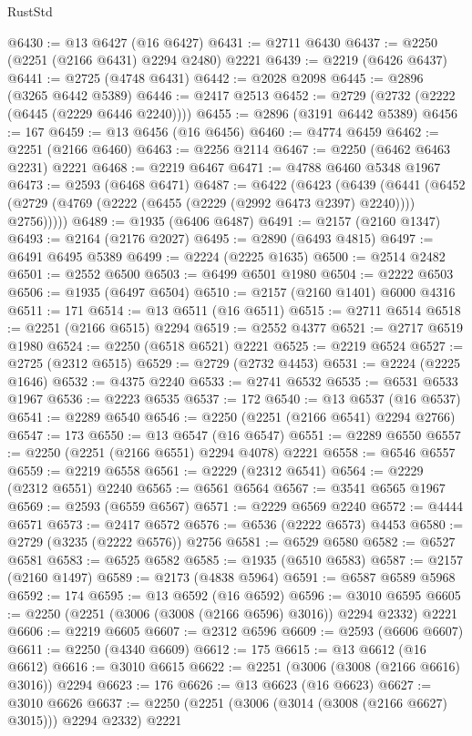 \begin{lexlean}{RustStd}
\begin{coremodule}
{\begin{coremodule}
{{{{{{{{{{{{{{{{{{{{{{{{{{{{{{{{{{{{{{{{{{{{{{{{{{{{{@6430 := @13 @6427 (@16 @6427)
@6431 := @2711 @6430
@6437 := @2250 (@2251 (@2166 @6431) @2294 @2480) @2221
@6439 := @2219 (@6426 @6437)
@6441 := @2725 (@4748 @6431)
@6442 := @2028 @2098
@6445 := @2896 (@3265 @6442 @5389)
@6446 := @2417 @2513
@6452 := @2729 (@2732 (@2222 (@6445 (@2229 @6446 @2240))))
@6455 := @2896 (@3191 @6442 @5389)
@6456 := 167
@6459 := @13 @6456 (@16 @6456)
@6460 := @4774 @6459
@6462 := @2251 (@2166 @6460)
@6463 := @2256 @2114
@6467 := @2250 (@6462 @6463 @2231) @2221
@6468 := @2219 @6467
@6471 := @4788 @6460 @5348 @1967
@6473 := @2593 (@6468 @6471)
@6487 := @6422
    (@6423
      (@6439
        (@6441 (@6452 (@2729 (@4769 (@2222 (@6455 (@2229 (@2992 @6473 @2397) @2240)))) @2756)))))
@6489 := @1935 (@6406 @6487)
@6491 := @2157 (@2160 @1347)
@6493 := @2164 (@2176 @2027)
@6495 := @2890 (@6493 @4815)
@6497 := @6491 @6495 @5389
@6499 := @2224 (@2225 @1635)
@6500 := @2514 @2482
@6501 := @2552 @6500
@6503 := @6499 @6501 @1980
@6504 := @2222 @6503
@6506 := @1935 (@6497 @6504)
@6510 := @2157 (@2160 @1401) @6000 @4316
@6511 := 171
@6514 := @13 @6511 (@16 @6511)
@6515 := @2711 @6514
@6518 := @2251 (@2166 @6515) @2294
@6519 := @2552 @4377
@6521 := @2717 @6519 @1980
@6524 := @2250 (@6518 @6521) @2221
@6525 := @2219 @6524
@6527 := @2725 (@2312 @6515)
@6529 := @2729 (@2732 @4453)
@6531 := @2224 (@2225 @1646)
@6532 := @4375 @2240
@6533 := @2741 @6532
@6535 := @6531 @6533 @1967
@6536 := @2223 @6535
@6537 := 172
@6540 := @13 @6537 (@16 @6537)
@6541 := @2289 @6540
@6546 := @2250 (@2251 (@2166 @6541) @2294 @2766)
@6547 := 173
@6550 := @13 @6547 (@16 @6547)
@6551 := @2289 @6550
@6557 := @2250 (@2251 (@2166 @6551) @2294 @4078) @2221
@6558 := @6546 @6557
@6559 := @2219 @6558
@6561 := @2229 (@2312 @6541)
@6564 := @2229 (@2312 @6551) @2240
@6565 := @6561 @6564
@6567 := @3541 @6565 @1967
@6569 := @2593 (@6559 @6567)
@6571 := @2229 @6569 @2240
@6572 := @4444 @6571
@6573 := @2417 @6572
@6576 := @6536 (@2222 @6573) @4453
@6580 := @2729 (@3235 (@2222 @6576)) @2756
@6581 := @6529 @6580
@6582 := @6527 @6581
@6583 := @6525 @6582
@6585 := @1935 (@6510 @6583)
@6587 := @2157 (@2160 @1497)
@6589 := @2173 (@4838 @5964)
@6591 := @6587 @6589 @5968
@6592 := 174
@6595 := @13 @6592 (@16 @6592)
@6596 := @3010 @6595
@6605 := @2250 (@2251 (@3006 (@3008 (@2166 @6596) @3016)) @2294 @2332) @2221
@6606 := @2219 @6605
@6607 := @2312 @6596
@6609 := @2593 (@6606 @6607)
@6611 := @2250 (@4340 @6609)
@6612 := 175
@6615 := @13 @6612 (@16 @6612)
@6616 := @3010 @6615
@6622 := @2251 (@3006 (@3008 (@2166 @6616) @3016)) @2294
@6623 := 176
@6626 := @13 @6623 (@16 @6623)
@6627 := @3010 @6626
@6637 := @2250 (@2251 (@3006 (@3014 (@3008 (@2166 @6627) @3015))) @2294 @2332) @2221
}}}}}}}}}}}}}}}}}}}}}}}}}}}}}}}}}}}}}}}}}}}}}}}}}}}}}
\end{coremodule}}
\end{coremodule}
\end{lexlean}
